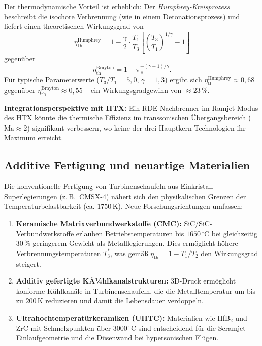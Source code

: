 ﻿\documentclass[12pt,a4paper]{article}
\theoremstyle{remark}
\newcommand{\Ma}{\mathrm{Ma}}
\newcommand{\piK}{\pi_{\mathrm{K}}}
\newcommand{\etath}{\eta_{\mathrm{th}}}
\begin{document}
Der thermodynamische Vorteil ist erheblich:
Der \emph{Humphrey-Kreisprozess} beschreibt die isochore Verbrennung
(wie in einem Detonationsprozess) und liefert einen theoretischen
Wirkungsgrad von
\begin{equation}
  \etath^{\mathrm{Humphrey}} = 1 - \frac{\gamma}{2} \cdot \frac{T_1}{T_3}
                               \left[\left(\frac{T_3}{T_1}\right)^{1/\gamma} - 1\right]
\end{equation}
gegen\"uber
\begin{equation}
  \etath^{\mathrm{Brayton}} = 1 - \piK^{-(\gamma-1)/\gamma}.
\end{equation}
F\"ur typische Parameterwerte ($T_3/T_1 = 5{,}0$, $\gamma = 1{,}3$) ergibt sich
$\etath^{\mathrm{Humphrey}} \approx 0{,}68$ gegen\"uber $\etath^{\mathrm{Brayton}} \approx 0{,}55$
-- ein Wirkungsgradgewinn von $\approx 23\,\%$.

\textbf{Integrationsperspektive mit HTX:}
Ein RDE-Nachbrenner im Ramjet-Modus des HTX k\"onnte die thermische Effizienz
im transsonischen \"Ubergangsbereich ($\Ma \approx 2$) signifikant verbessern,
wo keine der drei Hauptkern-Technologien ihr Maximum erreicht.

\subsection{Additive Fertigung und neuartige Materialien}

Die konventionelle Fertigung von Turbinenschaufeln aus
Einkristall-Superlegierungen (z.\,B.\ CMSX-4) n\"ahert sich den physikalischen
Grenzen der Temperaturbelastbarkeit (ca. $1750\,\mathrm{K}$).
Neue Forschungsrichtungen umfassen:

\begin{enumerate}[label=(\arabic*)]
  \item \textbf{Keramische Matrixverbundwerkstoffe (CMC):}
        SiC/SiC-Verbundwerkstoffe erlauben Betriebstemperaturen bis $1650\,^\circ\mathrm{C}$
        bei gleichzeitig $30\,\%$ geringerem Gewicht als Metalllegierungen.
        Dies erm\"oglicht h\"ohere Verbrennungstemperaturen $T_3^*$,
        was gem\"a{\ss} $\etath = 1 - T_1/T_2$ den Wirkungsgrad steigert.

  \item \textbf{Additiv gefertigte KÃ¼hlkanalstrukturen:}
        3D-Druck erm\"oglicht konforme K\"uhlkan\"ale in Turbinenschaufeln,
        die die Metalltemperatur um bis zu $200\,\mathrm{K}$ reduzieren
        und damit die Lebensdauer verdoppeln.

  \item \textbf{Ultrahochtemperat\"urkeramiken (UHTC):}
        Materialien wie HfB$_2$ und ZrC mit Schmelzpunkten \"uber $3000\,^\circ\mathrm{C}$
        sind entscheidend f\"ur die Scramjet-Einlaufgeometrie und die D\"usenwand
        bei hypersonischen Fl\"ugen.
\end{enumerate}
\end{document}
